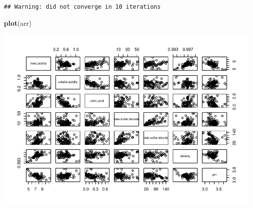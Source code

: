 \documentclass[]{article}
\newenvironment{Shaded}{\begin{snugshade}}{\end{snugshade}}
\newcommand{\KeywordTok}[1]{\textcolor[rgb]{0.13,0.29,0.53}{\textbf{#1}}}
\newcommand{\NormalTok}[1]{#1}
\begin{document}
\begin{verbatim}
## Warning: did not converge in 10 iterations
\end{verbatim}

\begin{Shaded}
\begin{Highlighting}[]
\KeywordTok{plot}\NormalTok{(arr)}
\end{Highlighting}
\end{Shaded}

\includegraphics{repport_files/figure-latex/unnamed-chunk-4-1.pdf}
\end{document}
